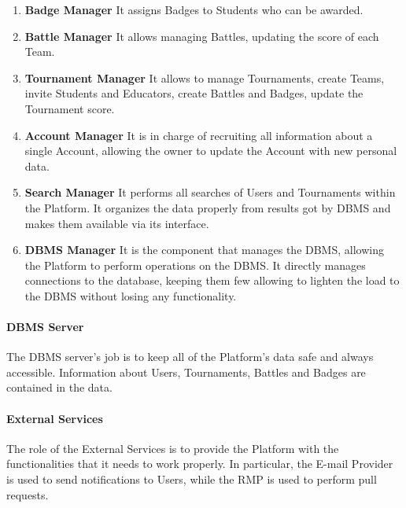 \begin{enumerate}
    \item \textbf{Badge Manager} \label{cmp:btm}It assigns Badges to Students who can be awarded. 
    \item \textbf{Battle Manager} \label{cmp:bam}It allows managing Battles, updating the score of each Team.
    \item \textbf{Tournament Manager} \label{cmp:tm}It allows to manage Tournaments, create Teams, invite Students and Educators, create Battles and Badges, update the Tournament score.
    \item \textbf{Account Manager} \label{cmp:am}It is in charge of recruiting all information about a single Account, allowing the owner to update the Account with new personal data.
    \item \textbf{Search Manager} \label{cmp:sm}It performs all searches of Users and Tournaments within the Platform. It organizes the data properly from results got by DBMS and makes them available via its interface.
    \item \textbf{DBMS Manager} \label{cmp:dbmsm}It is the component that manages the DBMS, allowing the Platform to perform operations on the DBMS. It directly manages connections to the database, keeping them few allowing to lighten the load to the DBMS without losing any functionality.
\end{enumerate}
\newpage
{}
\newpage
\paragraph{DBMS Server}
The DBMS server's job is to keep all of the Platform's data safe and always accessible. Information about Users, Tournaments, Battles and Badges are contained in the data.

\paragraph{External Services}
The role of the External Services is to provide the Platform with the functionalities that it needs to work properly. In particular, the E-mail Provider is used to send notifications to Users, while the RMP is used to perform pull requests.            
\newpage

